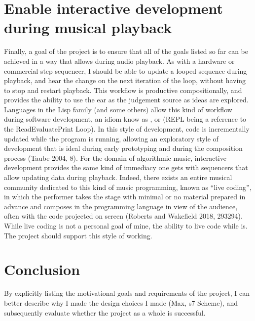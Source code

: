 \documentclass[letterpaper,10pt,english]{sphinxmanual}
\begin{document}
\section{Enable interactive development during musical playback}
\label{\detokenize{goals:enable-interactive-development-during-musical-playback}}
\sphinxAtStartPar
Finally, a goal of the project is to ensure that all of the goals listed so far can be achieved in a way that
allows  during audio playback.
As with a hardware or commercial step sequencer, I should be able to update a looped sequence during playback,
and hear the change on the next iteration of the loop, without having to stop and restart playback.
This workflow is productive compositionally, and provides the ability to use the ear as the judgement source as ideas are explored.
Languages in the Lisp family (and some others) allow this kind of workflow during software development,
an idiom know as , or  (REPL being a reference to the Read\sphinxhyphen{}Evaluate\sphinxhyphen{}Print Loop).
In this style of development, code is incrementally updated while the program is running, allowing an exploratory style of development
that is ideal during early prototyping and during the composition process (Taube 2004, 8).
For the domain of algorithmic music, interactive development provides the same kind of immediacy one
gets with sequencers that allow updating data during playback.
Indeed, there exists an entire musical community dedicated to this kind of music programming,
known as “live coding”, in which the performer takes the stage with minimal or no material prepared in advance
and composes in the programming language in view of the audience, often with the code projected on screen
(Roberts and Wakefield 2018, 293\sphinxhyphen{}294).
While  live coding is not a personal goal of mine, the ability to live code while  is.
The project should support this style of working.


\section{Conclusion}
\label{\detokenize{goals:conclusion}}
\sphinxAtStartPar
By explicitly listing the motivational goals and requirements of the project, I can
better describe why I made the design choices I made (Max, s7 Scheme),
and subsequently evaluate whether the project as a whole is successful.
\end{document}
